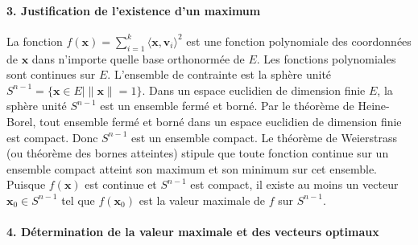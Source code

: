 \documentclass[11pt,a4paper]{report}
\begin{document}
\hypertarget{justification-de-lexistence-dun-maximum}{%
\paragraph{3. Justification de l'existence d'un
maximum}\label{justification-de-lexistence-dun-maximum}}

La fonction
\(f(\mathbf{x}) = \sum_{i=1}^k \langle \mathbf{x}, \mathbf{v}_i \rangle^2\)
est une fonction polynomiale des coordonnées de \(\mathbf{x}\) dans
n'importe quelle base orthonormée de \(E\). Les fonctions polynomiales
sont continues sur \(E\). L'ensemble de contrainte est la sphère unité
\(S^{n-1} = \{\mathbf{x} \in E \mid \|\mathbf{x}\|=1\}\). Dans un espace
euclidien de dimension finie \(E\), la sphère unité \(S^{n-1}\) est un
ensemble fermé et borné. Par le théorème de Heine-Borel, tout ensemble
fermé et borné dans un espace euclidien de dimension finie est compact.
Donc \(S^{n-1}\) est un ensemble compact. Le théorème de Weierstrass (ou
théorème des bornes atteintes) stipule que toute fonction continue sur
un ensemble compact atteint son maximum et son minimum sur cet ensemble.
Puisque \(f(\mathbf{x})\) est continue et \(S^{n-1}\) est compact, il
existe au moins un vecteur \(\mathbf{x}_0 \in S^{n-1}\) tel que
\(f(\mathbf{x}_0)\) est la valeur maximale de \(f\) sur \(S^{n-1}\).

\hypertarget{duxe9termination-de-la-valeur-maximale-et-des-vecteurs-optimaux}{%
\paragraph{4. Détermination de la valeur maximale et des vecteurs
optimaux}\label{duxe9termination-de-la-valeur-maximale-et-des-vecteurs-optimaux}}
\end{document}
